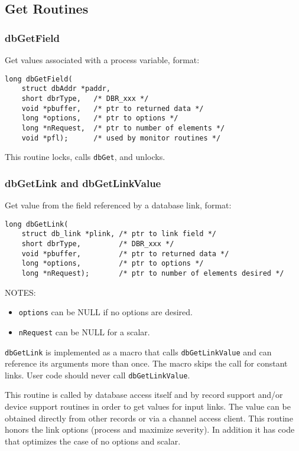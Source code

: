 \subsection{Get Routines}

\subsubsection{dbGetField}

Get values associated with a process variable, format:

\begin{verbatim}long dbGetField(
    struct dbAddr *paddr,
    short dbrType,   /* DBR_xxx */
    void *pbuffer,   /* ptr to returned data */
    long *options,   /* ptr to options */
    long *nRequest,  /* ptr to number of elements */
    void *pfl);      /* used by monitor routines */
\end{verbatim}This routine locks, calls \verb|dbGet|, and unlocks.

\subsubsection{dbGetLink and dbGetLinkValue}

Get value from the field referenced by a database link, format:

\begin{verbatim}
long dbGetLink(
    struct db_link *plink, /* ptr to link field */
    short dbrType,         /* DBR_xxx */
    void *pbuffer,         /* ptr to returned data */
    long *options,         /* ptr to options */
    long *nRequest);       /* ptr to number of elements desired */
\end{verbatim}
NOTES:

\begin{itemize}

\item \verb|options| can be NULL if no options are desired.

\item \verb|nRequest| can be NULL for a scalar.

\end{itemize}\verb|dbGetLink| is implemented as a macro that calls \verb|dbGetLinkValue| and can reference its arguments more than once. 
The macro skips the call for constant links. User code should never call \verb|dbGetLinkValue|.

This routine is called by database access itself and by record support and/or device support routines in order to get values 
for input links. The value can be obtained directly from other records or via a channel access client. This routine honors 
the link options (process and maximize severity). In addition it has code that optimizes the case of no options and scalar.

